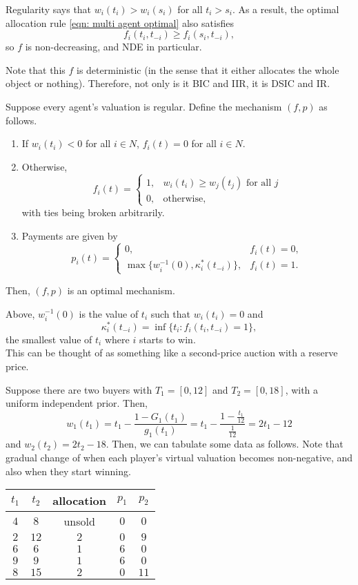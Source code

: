 		Regularity says that $w_i(t_i) > w_i(s_i)$ for all $t_i > s_i$. As a result, the optimal allocation rule \cref{eqn: multi agent optimal} also satisfies
		\[ f_i(t_i,t_{-i}) \ge f_i(s_i,t_{-i}), \]
		so $f$ is non-decreasing, and NDE in particular.
		
		Note that this $f$ is deterministic (in the sense that it either allocates the whole object or nothing). Therefore, not only is it BIC and IIR, it is DSIC and IR.

		\begin{ftheo}
			Suppose every agent's valuation is regular. Define the mechanism $(f,p)$ as follows.
			\begin{enumerate}
				\item If $w_i(t_i) < 0$ for all $i \in N$, $f_i(t) = 0$ for all $i \in N$.
				\item Otherwise,
				\[ f_i(t) = \begin{cases} 1, & w_i(t_i) \ge w_j(t_j) \text{ for all $j$} \\ 0, & \text{otherwise,} \end{cases} \]
				with ties being broken arbitrarily.
				\item Payments are given by
				\[ p_i(t) = \begin{cases} 0, & f_i(t) = 0, \\ \max\{w_i^{-1}(0), \kappa_i^*(t_{-i})\}, & f_i(t) = 1. \end{cases} \]
			\end{enumerate}
			Then, $(f,p)$ is an optimal mechanism.
		\end{ftheo}
		Above, $w_i^{-1}(0)$ is the value of $t_i$ such that $w_i(t_i) = 0$ and
		\[ \kappa_i^*(t_{-i}) = \inf\{t_i : f_i(t_i,t_{-i}) = 1\}, \]
		the smallest value of $t_i$ where $i$ starts to win.\\
		This can be thought of as something like a second-price auction with a reserve price.

		\begin{fex}
			Suppose there are two buyers with $T_1 = [0,12]$ and $T_2 = [0,18]$, with a uniform independent prior. Then,
			\[ w_1(t_1) = t_1 - \frac{1-G_1(t_1)}{g_1(t_1)} = t_1 - \frac{1-\frac{t_1}{12}}{\frac{1}{12}} = 2t_1-12 \]
			and $w_2(t_2) = 2t_2-18$. Then, we can tabulate some data as follows. Note that gradual change of when each player's virtual valuation becomes non-negative, and also when they start winning.
			\begin{center}
			\begin{tabular}{|c|c|c|c|c|}
				\hline $t_1$ & $t_2$ & allocation & $p_1$ & $p_2$ \\ \hline\hline
				$4$ & $8$ & unsold & $0$ & $0$ \\
				$2$ & $12$ & $2$ & $0$ & $9$ \\
				$6$ & $6$ & $1$ & $6$ & $0$ \\
				$9$ & $9$ & $1$ & $6$ & $0$ \\
				$8$ & $15$ & $2$ & $0$ & $11$ \\ \hline
			\end{tabular}
			\end{center}
		\end{fex}

